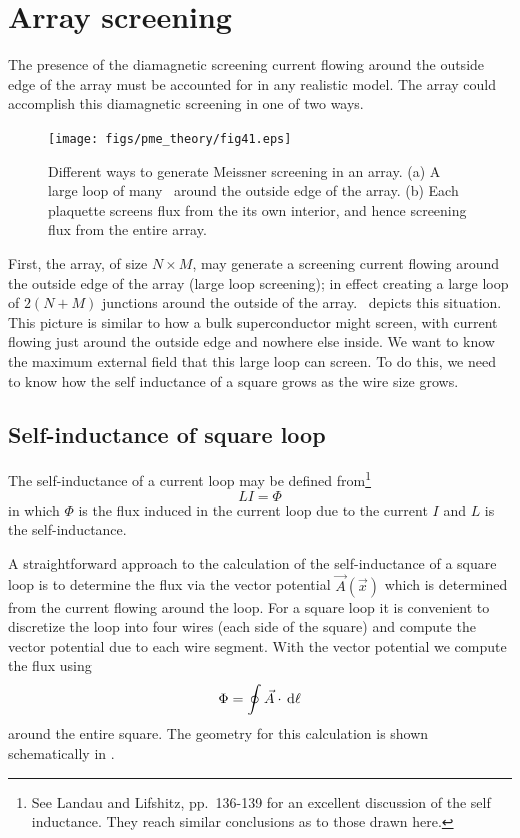 \section{Array screening}

The presence of the diamagnetic screening current flowing around
the outside edge of the array must be accounted for in any 
realistic model. The array could accomplish this diamagnetic
screening in one of two ways. 

\begin{figure}[p]
\texttt{[image: figs/pme\_theory/fig41.eps]}
\caption[Comparative array screening: individual plaquette \vs\ 
large outside loop.]
{Different ways to generate Meissner screening in an array.
(a) A large loop of many \jjsnoun\ around the outside edge of the
array. (b) Each plaquette screens flux from the its own interior,
and hence screening flux from the entire array. }
\label{fig:comp_array_screening}
\end{figure}

First, the array, of size $N\times M$, may generate a screening
current flowing around the outside edge of the array
(large loop screening); in effect
creating a large loop of $2(N + M)$ junctions around the outside
of the array. 
\ depicts this situation. 
This picture is similar to how a bulk 
superconductor might screen, with current flowing just around the outside
edge and nowhere else inside. 
We want to know the maximum external field that this 
large loop can screen. To do this, we need to know how the self
inductance of a square grows as the wire size grows. 

\subsection{Self-inductance of square loop}
\label{sec:self_ind_square_loop}

The self-inductance of a current loop
may be defined from\footnote{See Landau and Lifshitz\cite{landau_lifshitz_em},
pp.~136-139
for an excellent discussion of the self inductance.
They reach similar conclusions as to those drawn here.}
%
\begin{equation}
L I = \Phi
\label{eqn:self_ind_defn}
\end{equation}
%
in which $\Phi$ is the flux induced in the current loop due to the
current $I$ and $L$ is the self-inductance.

A straightforward approach to the calculation of the self-inductance
of a square loop is to determine the flux via the vector 
potential
$\vec{A}(\vec{x})$ which is determined from the 
current flowing around the loop.
For a square loop it is convenient to 
discretize the loop into four wires (each side of the square) and
compute the vector potential due to each wire segment. With the vector
potential we
compute the flux using
%
\begin{equation}
\Phi = \oint \vec{A}\cdot\,\mathrm{d} \ell 
\label{eqn:flux_vec_pot}
\end{equation}
%
around the entire square. 
The geometry for this calculation is shown schematically in 
.

